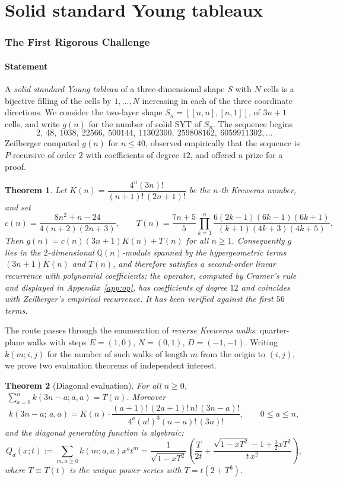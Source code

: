 \documentclass[11pt]{article}
\newtheorem{theorem}{Theorem}[section]
\theoremstyle{definition}
\begin{document}
\part{Solid standard Young tableaux}

\section{The First Rigorous Challenge}\label{sec:syt}

\subsection{Statement}

A \emph{solid standard Young tableau} of a three-dimensional shape $S$ with $N$
cells is a bijective filling of the cells by $1,\dots,N$ increasing in each of
the three coordinate directions. We consider the two-layer shape
$S_n=[[n,n],[n,1]]$, of $3n+1$ cells, and write $g(n)$ for the number of solid
SYT of $S_n$. The sequence begins
\[
  2,\ 48,\ 1038,\ 22566,\ 500144,\ 11302300,\ 259808162,\ 6059911302,\dots
\]
Zeilberger computed $g(n)$ for $n\le40$, observed empirically that the sequence
is $P$-recursive of order $2$ with coefficients of degree $12$, and offered a
prize for a proof.

\begin{theorem}\label{thm:sytmain}
Let $K(n)=\dfrac{4^{n}(3n)!}{(n+1)!\,(2n+1)!}$ be the $n$-th Kreweras number,
and set
\[
  c(n)=\frac{8n^{2}+n-24}{4(n+2)(2n+3)},\qquad
  T(n)=\frac{7n+5}{5}\prod_{k=1}^{n}
   \frac{6(2k-1)(6k-1)(6k+1)}{(k+1)(4k+3)(4k+5)}.
\]
Then $g(n)=c(n)(3n+1)K(n)+T(n)$ for all $n\ge1$. Consequently $g$ lies in the
$2$-dimensional $\mathbb{Q}(n)$-module spanned by the hypergeometric terms
$(3n+1)K(n)$ and $T(n)$, and therefore satisfies a second-order linear
recurrence with polynomial coefficients; the operator, computed by Cramer's
rule and displayed in Appendix~\ref{app:op}, has coefficients of degree $12$
and coincides with Zeilberger's empirical recurrence. It has been verified
against the first $56$ terms.
\end{theorem}

The route passes through the enumeration of \emph{reverse Kreweras walks}:
quarter-plane walks with steps $E=(1,0)$, $N=(0,1)$, $D=(-1,-1)$. Writing
$k(m;i,j)$ for the number of such walks of length $m$ from the origin to
$(i,j)$, we prove two evaluation theorems of independent interest.

\begin{theorem}[Diagonal evaluation]\label{thm:B}
For all $n\ge0$, $\ \sum_{a=0}^{n}k(3n-a;a,a)=T(n)$. Moreover
\[
  k(3n-a;\,a,a)=K(n)\cdot
  \frac{(a+1)!\,(2a+1)!\,n!\,(3n-a)!}{4^{a}(a!)^{3}(n-a)!\,(3n)!},
  \qquad 0\le a\le n,
\]
and the diagonal generating function is algebraic:
\begin{equation}\label{eq:Qd}
  Q_d(x;t):=\sum_{m,a\ge0}k(m;a,a)x^{a}t^{m}
  =\frac{1}{\sqrt{1-xT^{2}}}
   \left(\frac{T}{2t}+\frac{\sqrt{1-xT^{2}}-1+\tfrac12xT^{2}}{t\,x^{2}}\right),
\end{equation}
where $T\equiv T(t)$ is the unique power series with $T=t(2+T^{3})$.
\end{theorem}
\end{document}
